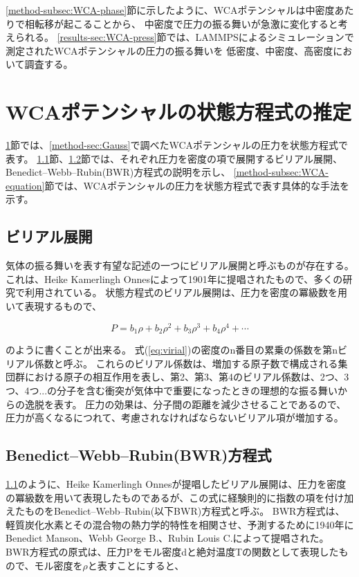 \documentclass[titlepage]{jsreport}
\begin{document}
{{{\ref{method-subsec:WCA-phase}節に示したように、WCAポテンシャルは中密度あたりで相転移が起こることから、
中密度で圧力の振る舞いが急激に変化すると考えられる。
\ref{results-sec:WCA-press}節では、LAMMPSによるシミュレーションで測定されたWCAポテンシャルの圧力の振る舞いを
低密度、中密度、高密度において調査する。

\section{WCAポテンシャルの状態方程式の推定}\label{method-sec:WCA-equation}
\ref{method-sec:WCA-equation}節では、\ref{method-sec:Gauss}で調べたWCAポテンシャルの圧力を状態方程式で表す。
\ref{method-subsec:virial}節、\ref{method-subsec:BWR}節では、それぞれ圧力を密度の項で展開するビリアル展開、Benedict–Webb–Rubin(BWR)方程式の説明を示し、
\ref{method-subsec:WCA-equation}節では、WCAポテンシャルの圧力を状態方程式で表す具体的な手法を示す。

\subsection{ビリアル展開}\label{method-subsec:virial}
気体の振る舞いを表す有望な記述の一つにビリアル展開と呼ぶものが存在する。
これは、Heike Kamerlingh Onnesによって1901年に提唱されたもの\cite{virial-Heike}で、多くの研究で利用されている。
状態方程式のビリアル展開は、圧力を密度の冪級数を用いて表現するもので、

\large
\begin{equation}
P=b_1{\rho}+b_2{\rho}^2+b_3{\rho}^3+b_4{\rho}^4+\cdots \label{eq:virial}
\end{equation}

\normalsize
のように書くことが出来る。
式(\ref{eq:virial})の密度のn番目の累乗の係数を第nビリアル係数と呼ぶ\cite{virial-expansion}。
これらのビリアル係数は、増加する原子数で構成される集団群における原子の相互作用を表し、第2、第3、第4のビリアル係数は、2つ、3つ、4つ...の分子を含む衝突が気体中で重要になったときの理想的な振る舞いからの逸脱を表す。
圧力の効果は、分子間の距離を減少させることであるので、圧力が高くなるにつれて、考慮されなければならないビリアル項が増加する\cite{virial-Heike}。

\subsection{Benedict–Webb–Rubin(BWR)方程式}\label{method-subsec:BWR}
\ref{method-subsec:virial}のように、Heike Kamerlingh Onnesが提唱したビリアル展開は、圧力を密度の冪級数を用いて表現したものであるが、この式に経験則的に指数の項を付け加えたものをBenedict–Webb–Rubin(以下BWR)方程式と呼ぶ。
BWR方程式は、軽質炭化水素とその混合物の熱力学的特性を相関させ、予測するために1940年にBenedict Manson、Webb George B.、Rubin Louis C.によって提唱された\cite{BWR-equation:original}。
BWR方程式の原式は、圧力Pをモル密度dと絶対温度Tの関数として表現したもので、モル密度を$\rho$と表すことにすると、

}}}
\end{document}
